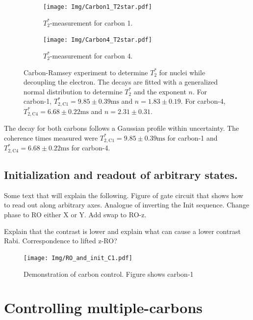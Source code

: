 \begin{figure}[htbp]
    \begin{subfigure}[t]{0.49\textwidth}\centering
        \texttt{[image: Img/Carbon1\_T2star.pdf]}
        \caption{$T_2^*$-measurement for carbon 1.}
        \label{fig:T2star_carbon1}
    \end{subfigure}
    \begin{subfigure}[t]{0.49\textwidth}\centering
        \texttt{[image: Img/Carbon4\_T2star.pdf]}
        \caption{$T_2^*$-measurement for carbon 4.   }
        \label{fig:T2star_carbon4}
    \end{subfigure}
    \caption{Carbon-Ramsey experiment to determine $T_2^*$ for nuclei while decoupling the electron.
    The decays are fitted with a generalized normal distribution to determine $T_2^*$ and the exponent $n$.
    For carbon-1, $T_{2,\mathrm{C1}}^* =9.85 \pm   0.39 \mathrm{ms}$ and $n= 1.83 \pm 0.19$.
    For carbon-4,  $T_{2,\mathrm{C4}}^* =6.68 \pm   0.22 \mathrm{ms}$ and $n= 2.31 \pm 0.31$. } %
    \label{fig:T2star_carbon}
\end{figure}

The decay for both carbons follows a Gaussian profile within uncertainty.
The coherence times measured were $T_{2,\mathrm{C1}}^* =9.85 \pm   0.39 \mathrm{ms}$ for carbon-1 and $T_{2,\mathrm{C4}}^* =6.68 \pm   0.22 \mathrm{ms}$ for carbon-4.
\subsection{Initialization and readout of arbitrary states.}
Some text that will explain the following.
Figure of gate circuit that shows how to read out along arbitrary axes. Analogue of inverting the Init sequence. Change phase to RO either X or Y. Add swap to RO-z.

Explain that the contrast is lower and explain what can cause a lower contrast Rabi.
Correspondence to lifted z-RO?


\begin{figure}[htbp]
    \centering
    \texttt{[image: Img/RO\_and\_init\_C1.pdf]}
    \caption{Demonstration of carbon control. Figure shows carbon-1 }
    \label{fig:control_demo}
\end{figure}

\section{Controlling multiple-carbons}
